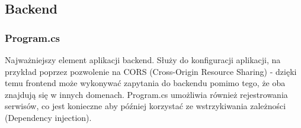 \subsection{Backend}

\subsubsection{Program.cs}

Najważniejszy element aplikacji backend. Służy do konfiguracji aplikacji, na przykład poprzez pozwolenie na CORS (Cross-Origin Resource Sharing) - dzięki temu frontend może wykonywać zapytania do backendu pomimo tego, że oba znajdują się w innych domenach. Program.cs umożliwia również rejestrowania serwisów, co jest konieczne aby później korzystać ze wstrzykiwania zależności (Dependency injection). 


